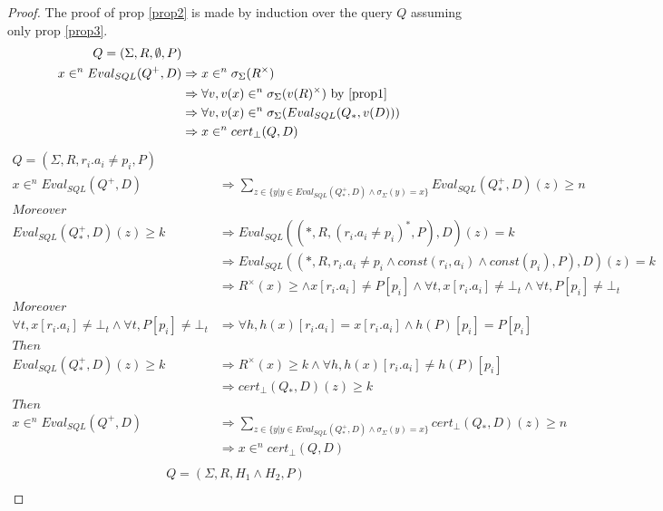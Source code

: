 \begin{proof}
	The proof of prop \ref{prop2} is made by induction over the query $Q$ assuming only prop \ref{prop3}.
	\begin{align*}
		Q = (\Sigma,R,\emptyset,P) \\
		x \in^n Eval_{SQL}(Q^+,D) & \Rightarrow x \in^n \sigma_\Sigma(R^\times)  \\
		& \Rightarrow \forall v, v(x) \in^n \sigma_\Sigma(v(R)^\times) \mbox{ by \ref{prop1}} \\
		& \Rightarrow \forall v, v(x) \in^n \sigma_\Sigma(Eval_{SQL}(Q_*,v(D))) \\
		& \Rightarrow x \in^n cert_\bot(Q,D)
	\end{align*}
	\begin{align*}
		Q = (\Sigma,R,r_i.a_i \neq p_i,P) \\
		x \in^n Eval_{SQL}(Q^+,D) & \Rightarrow \sum_{z \in \{y | y \in Eval_{SQL}(Q_*^+,D) \land \sigma_\Sigma(y) = x \} }{Eval_{SQL}(Q_*^+,D)(z)} \geq n  \\
		Moreover\\
		Eval_{SQL}(Q^+_*,D)(z)  \geq k & \Rightarrow  Eval_{SQL}((*,R,(r_i.a_i \neq p_i )^*,P),D)(z)  = k \\
		& \Rightarrow Eval_{SQL}((*,R,r_i.a_i \neq p_i \land const(r_i,a_i) \land const(p_i),P),D)(z)  = k \\
		& \Rightarrow R^\times(x) \geq \land x[r_i.a_i] \neq P[p_i] \land \forall t, x[r_i.a_i] \neq \bot_t \land \forall t, P[p_i] \neq \bot_t \\
		Moreover \\
		\forall t, x[r_i.a_i] \neq \bot_t \land \forall t, P[p_i] \neq \bot_t & \Rightarrow \forall h, h(x)[r_i.a_i] = x[r_i.a_i] \land h(P)[p_i] = P[p_i] \\
		Then \\
		Eval_{SQL}(Q^+_*,D)(z) \geq k & \Rightarrow R^\times(x) \geq k \land \forall h, h(x)[r_i.a_i] \neq h(P)[p_i] \\
		& \Rightarrow cert_\bot(Q_*,D)(z) \geq k \\
		Then \\
		x \in^n Eval_{SQL}(Q^+,D) & \Rightarrow \sum_{z \in \{y | y \in Eval_{SQL}(Q_*^+,D) \land \sigma_\Sigma(y) = x \} }{cert_\bot(Q_*,D)(z)} \geq n  \\
		& \Rightarrow x \in^n cert_\bot(Q,D) \\
	\end{align*}
	\begin{align*}
		Q = (\Sigma,R,H_1\land H_2,P) \\

\end{align*}
\end{proof}
